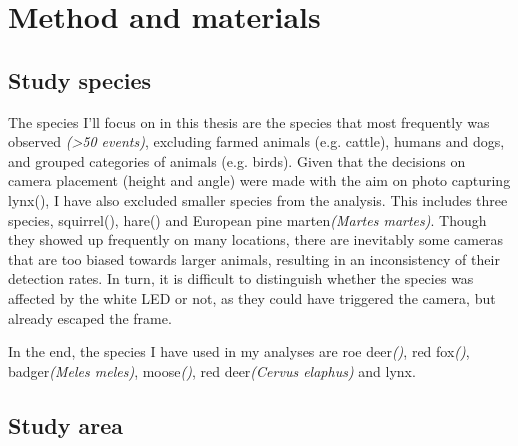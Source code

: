 \chapter{Method and materials}


\section{Study species} %


The species I'll focus on in this thesis are the species that most frequently was observed \emph{(>50 events)}, excluding farmed animals (e.g. cattle), humans and dogs, and grouped categories of animals (e.g. birds).
Given that the decisions on camera placement (height and angle) were made with the aim on photo capturing lynx(), I have also excluded smaller species from the analysis.
This includes three species, squirrel(), hare() and European pine marten\textit{(Martes martes)}. 
Though they showed up frequently on many locations, there are inevitably some cameras that are too biased towards larger animals, resulting in an inconsistency of their detection rates. 
In turn, it is difficult to distinguish whether the species was affected by the white LED or not, as they could have triggered the camera, but already escaped the frame. %

In the end, the species I have used in my analyses are roe deer\textit{()}, red fox\textit{()}, badger\textit{(Meles meles)}, moose\textit{()}, red deer\textit{(Cervus elaphus)} and lynx. 

\section{Study area} %


